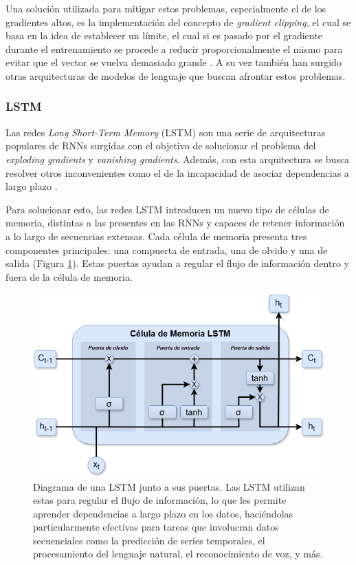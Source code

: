 Una solución utilizada para mitigar estos problemas, especialmente el de los gradientes altos, es la implementación del concepto de \textit{gradient clipping}, el cual se basa en la idea de establecer un límite, el cual si es pasado por el gradiente durante el entrenamiento se procede a reducir proporcionalmente el mismo para evitar que el vector se vuelva demasiado grande  \parencite{pascanu2013difficultytrainingrecurrentneural}. A su vez también han surgido otras arquitecturas de modelos de lenguaje que buscan afrontar estos problemas.

\subsubsection{LSTM}

Las redes \textit{Long Short-Term Memory} (LSTM) son una serie de arquitecturas populares de RNNs surgidas con el objetivo de solucionar el problema del \textit{exploding gradients} y \textit{vanishing gradients}. Además, con esta arquitectura se busca resolver otros inconvenientes como el de la incapacidad de asociar dependencias a largo plazo \parencite{lstm}.

Para solucionar esto, las redes LSTM introducen un nuevo tipo de células de memoria, distintas a las presentes en las RNNs y capaces de retener información a lo largo de secuencias extensas. Cada célula de memoria presenta tres componentes principales: una compuerta de entrada, una de olvido y una de salida (Figura \ref{fig:lstm}). Estas puertas ayudan a regular el flujo de información dentro y fuera de la célula de memoria.

\begin{figure}[H]
    \centering
    \includegraphics[width=1\textwidth]{imagenes/LSTM.png}
    \caption{Diagrama de una LSTM junto a sus puertas. Las LSTM utilizan estas para regular el flujo de información, lo que les permite aprender dependencias a largo plazo en los datos, haciéndolas particularmente efectivas para tareas que involucran datos secuenciales como la predicción de series temporales, el procesamiento del lenguaje natural, el reconocimiento de voz, y más.}
    \label{fig:lstm}
\end{figure}

